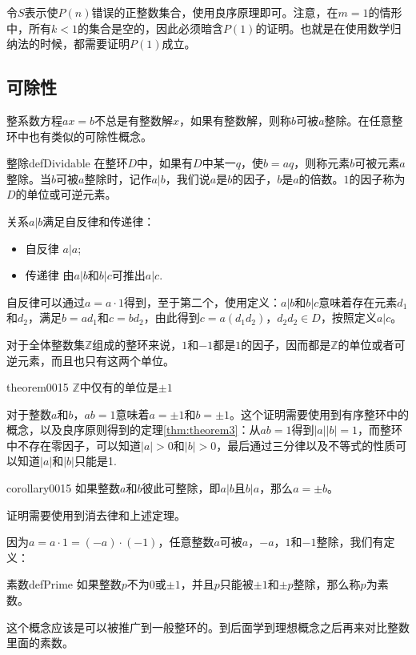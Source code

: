 令$S$表示使$P(n)$错误的正整数集合，使用良序原理即可。注意，在$m=1$的情形中，所有$k<1$的集合是空的，因此必须暗含$P(1)$的证明。也就是在使用数学归纳法的时候，都需要证明$P(1)$成立。

\subsection{可除性}
整系数方程$ax=b$不总是有整数解$x$，如果有整数解，则称$b$可被$a$整除。在任意整环中也有类似的可除性概念。
\begin{definition}{整除}{defDividable}
在整环$D$中，如果有$D$中某一$q$，使$b=aq$，则称元素$b$可被元素$a$整除。当$b$可被$a$整除时，记作$a|b$，我们说$a$是$b$的因子，$b$是$a$的倍数。$1$的因子称为$D$的单位或可逆元素。
\end{definition}
关系$a|b$满足自反律和传递律：
\begin{itemize}
\item 自反律 $a|a$;
\item 传递律 由$a|b$和$b|c$可推出$a|c$.
\end{itemize}
自反律可以通过$a=a\cdot{}1$得到，至于第二个，使用定义：$a|b$和$b|c$意味着存在元素$d_1$和$d_2$，满足$b=ad_1$和$c=bd_2$，由此得到$c=a(d_1d_2)$，$d_2d_2 \in D$，按照定义$a|c$。


对于全体整数集$\mathbb{Z}$组成的整环来说，$1$和$-1$都是$1$的因子，因而都是$\mathbb{Z}$的单位或者可逆元素，而且也只有这两个单位。
\begin{theorem}{}{theorem0015}
$\mathbb{Z}$中仅有的单位是$\pm1$
\end{theorem}
对于整数$a$和$b$，$ab=1$意味着$a=\pm1$和$b=\pm1$。这个证明需要使用到有序整环中的概念，以及良序原则得到的定理\ref{thm:theorem3}：从$ab=1$得到$|a||b|=1$，而整环中不存在零因子，可以知道$|a|>0$和$|b|>0$，最后通过三分律以及不等式的性质可以知道$|a|$和$|b|$只能是1.

\begin{corollary}{}{corollary0015}
如果整数$a$和$b$彼此可整除，即$a|b$且$b|a$，那么$a=\pm{}b$。
\end{corollary}

证明需要使用到消去律和上述定理。

因为$a=a \cdot 1 = (-a) \cdot (-1)$，任意整数$a$可被$a$，$-a$，$1$和$-1$整除，我们有定义：
\begin{definition}{素数}{defPrime}
如果整数$p$不为0或$\pm{}1$，并且$p$只能被$\pm{}1$和$\pm{}p$整除，那么称$p$为素数。
\end{definition}
这个概念应该是可以被推广到一般整环的。到后面学到理想概念之后再来对比整数里面的素数。

